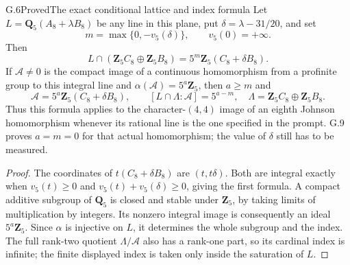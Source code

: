 \begin{statement}{G.6}{Proved}{The exact conditional lattice and index formula}
Let $L=\mathbf Q_5(A_8+\lambda B_8)$ be any line in this plane,
put $\delta=\lambda-31/20$, and set
\[
 m=\max\{0,-v_5(\delta)\},\qquad v_5(0)=+\infty.
\]
Then
\[
 L\cap(\mathbf Z_5C_8\oplus\mathbf Z_5B_8)
     =5^m\mathbf Z_5(C_8+\delta B_8).
\]
If $\mathcal A\ne0$ is the compact image of a continuous
homomorphism from a profinite group to this integral line and
$\alpha(\mathcal A)=5^a\mathbf Z_5$, then $a\geq m$ and
\[
 \mathcal A=5^a\mathbf Z_5(C_8+\delta B_8),\qquad
 [L\cap\Lambda:\mathcal A]=5^{a-m},
 \quad\Lambda=\mathbf Z_5C_8\oplus\mathbf Z_5B_8.
\]
Thus this formula applies to the character-$(4,4)$ image of an
eighth Johnson homomorphism whenever its rational line is the
one specified in the prompt. G.9 proves $a=m=0$ for that actual
homomorphism; the value of $\delta$ still has to be measured.
\end{statement}
\begin{proof}
The coordinates of $t(C_8+\delta B_8)$ are $(t,t\delta)$.
Both are integral exactly when $v_5(t)\geq0$ and
$v_5(t)+v_5(\delta)\geq0$, giving the first formula.
A compact additive subgroup of $\mathbf Q_5$ is closed and stable
under $\mathbf Z_5$, by taking limits of multiplication by integers.
Its nonzero integral image is consequently an ideal
$5^a\mathbf Z_5$. Since $\alpha$ is injective on $L$, it determines
the whole subgroup and the index. The full rank-two quotient
$\Lambda/\mathcal A$ also has a rank-one part, so its cardinal
index is infinite; the finite displayed index is taken only inside
the saturation of $L$.
\end{proof}

